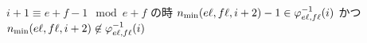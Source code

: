 \begin{lemma}
\label{lm:main_lemma.case_b}
$
i + 1 \equiv e + f - 1 \mod e + f
$
の時
$
n_{\mathrm{min}} (e \ell, f \ell, i+2) - 1
\in
\varphi_{e \ell, f \ell}^{-1}(i)
$
かつ
$
n_{\mathrm{min}} (e \ell, f \ell, i+2)
\not \in
\varphi_{e \ell, f \ell}^{-1}(i)
$
\end{lemma}


